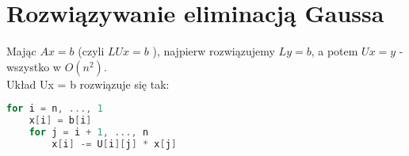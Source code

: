 \section{Rozwiązywanie eliminacją Gaussa}
Mając \( Ax = b \) (czyli \( LUx = b \) ), najpierw rozwiązujemy \( Ly = b \), a
potem \( Ux = y \) - wszystko w \( O(n^2) \). \\

\noindent
Układ Ux = b rozwiązuje się tak:
\begin{lstlisting}[language=Cpp]
for i = n, ..., 1
    x[i] = b[i]
    for j = i + 1, ..., n
        x[i] -= U[i][j] * x[j]
\end{lstlisting}
